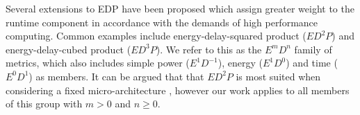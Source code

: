 Several extensions to EDP have been proposed which assign greater weight to the runtime component in accordance with the demands of high performance computing. Common examples include energy-delay-squared product ($ED^{2}P$) and energy-delay-cubed product ($ED^{3}P$). We refer to this as the $E^mD^n$ family of metrics, which also includes simple power ($E^1D^{-1}$), energy ($E^1D^0$) and time ($E^0D^1$) as members. It can be argued that that $ED^{2}P$ is most suited when considering a fixed micro-architecture \cite{brooks:2000aa}, however our work applies to all members of this group with $m > 0$ and $n \geq 0$.
